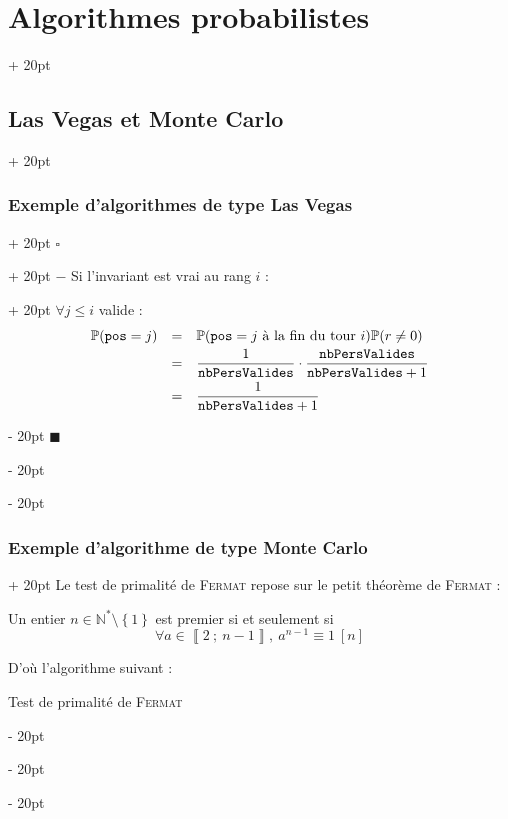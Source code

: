 \documentclass[a4paper, 12pt, twoside]{article}
\newenvironment{indalgo}[2][H]{
    \begin{algoBox}
        \begin{algorithm}[#1]
            \caption{#2}
}
{
        \end{algorithm}
    \end{algoBox}
}
\newcommand{\N}{\mathbb{N}} %
\newcommand{\nset}[2]{\left\llbracket #1\ ;\ #2 \right\rrbracket}
\newcommand{\set}[1]{\left\{ #1 \right\}}
\renewcommand{\le}{\leqslant}
\newcommand{\ind}[1][20pt]{\advance\leftskip + #1}
\newcommand{\deind}[1][20pt]{\advance\leftskip - #1}
\newenvironment{indt}[2][20pt]{#2 \par \ind[#1]}{\par \deind} %
\newenvironment{proof}[1][{}]{\begin{indt}{$\square$ #1}}{$\blacksquare$ \end{indt}}
\newcommand{\1}{\mathbbm 1}
\begin{document}
\begin{indt}{\section{Algorithmes probabilistes}}
\begin{indt}{\subsection{Las Vegas et Monte Carlo}}
\begin{indt}{\subsubsection{Exemple d'algorithmes de type Las Vegas}}
\begin{proof}
\begin{indt}{$-$ Si l'invariant est vrai au rang $i$ :}
                        $\forall j \le i$ valide :
                        \[
                            \begin{array}{rcl}
                                \mathbb P(\mathtt{pos} = j)
                                &=& \mathbb P(\mathtt{pos} = j\ \text{à la fin du tour}\ i) \mathbb{P}(r \neq 0)
                                \vspace{3pt}
                                \\
                                &=& \dfrac 1 {\mathtt{nbPersValides}} \cdot \dfrac{\mathtt{nbPersValides}}{\mathtt{nbPersValides} + 1}
                                \vspace{3pt}
                                \\
                                &=& \dfrac{1}{\mathtt{nbPersValides} + 1}
                            \end{array}
                        \]
                    \end{indt}
                \end{proof}
            \end{indt}

            \vspace{12pt}
            
            \begin{indt}{\subsubsection{Exemple d'algorithme de type Monte Carlo}}
                Le test de primalité de \textsc{Fermat} repose sur le petit théorème de \textsc{Fermat} :
                \begin{emphBox}
                    Un entier $n \in \N^* \setminus \set 1$ est premier si et seulement si
                    \[
                        \forall a \in \nset 2 {n - 1},\ a^{n - 1} \equiv 1\ [n]
                    \]
                \end{emphBox}

                D'où l'algorithme suivant :
                \begin{indalgo}{Test de primalité de \textsc{Fermat}}

                \end{indalgo}


\end{indt}
\end{indt}
\end{indt}
\end{document}
